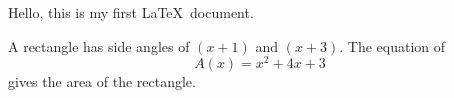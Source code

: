 \documentclass[10pt]{article}
\begin{document}
Hello, this is my first \LaTeX\ document.

A rectangle has side angles of $(x+1)$ and $(x+3)$. The equation of $${A(x)=x^2+4x+3}$$ gives the area of the rectangle.
\end{document}
